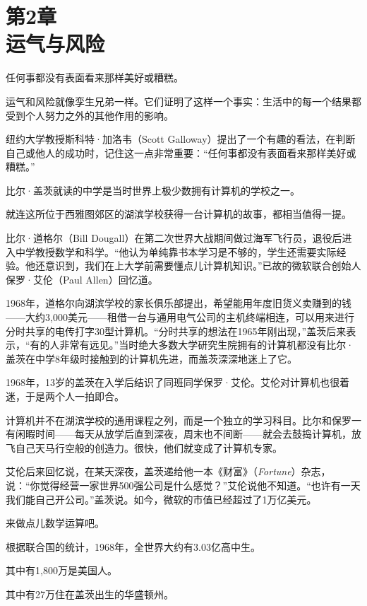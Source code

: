 
\section[第2章\q 运气与风险]{第2章\\ 运气与风险}

{\kaishu

任何事都没有表面看来那样美好或糟糕。

}

运气和风险就像孪生兄弟一样。它们证明了这样一个事实：生活中的每一个结果都受到个人努力之外的其他作用的影响。

纽约大学教授斯科特·加洛韦（Scott Galloway）提出了一个有趣的看法，在判断自己或他人的成功时，记住这一点非常重要：“任何事都没有表面看来那样美好或糟糕。”

比尔·盖茨就读的中学是当时世界上极少数拥有计算机的学校之一。

就连这所位于西雅图郊区的湖滨学校获得一台计算机的故事，都相当值得一提。

比尔·道格尔（Bill Dougall）在第二次世界大战期间做过海军飞行员，退役后进入中学教授数学和科学。“他认为单纯靠书本学习是不够的，学生还需要实际经验。他还意识到，我们在上大学前需要懂点儿计算机知识。”已故的微软联合创始人保罗·艾伦（Paul Allen）回忆道。

1968年，道格尔向湖滨学校的家长俱乐部提出，希望能用年度旧货义卖赚到的钱——大约3,000美元——租借一台与通用电气公司的主机终端相连，可以用来进行分时共享的电传打字30型计算机。“分时共享的想法在1965年刚出现，”盖茨后来表示，“有的人非常有远见。”当时绝大多数大学研究生院拥有的计算机都没有比尔·盖茨在中学8年级时接触到的计算机先进，而盖茨深深地迷上了它。

1968年，13岁的盖茨在入学后结识了同班同学保罗·艾伦。艾伦对计算机也很着迷，于是两个人一拍即合。

计算机并不在湖滨学校的通用课程之列，而是一个独立的学习科目。比尔和保罗一有闲暇时间——每天从放学后直到深夜，周末也不间断——就会去鼓捣计算机，放飞自己天马行空般的创造力。很快，他们就变成了计算机专家。

艾伦后来回忆说，在某天深夜，盖茨递给他一本《财富》（\textit{Fortune}）杂志，说：“你觉得经营一家世界500强公司是什么感觉？”艾伦说他不知道。“也许有一天我们能自己开公司。”盖茨说。如今，微软的市值已经超过了1万亿美元。

来做点儿数学运算吧。

根据联合国的统计，1968年，全世界大约有3.03亿高中生。

其中有1,800万是美国人。

其中有27万住在盖茨出生的华盛顿州。


